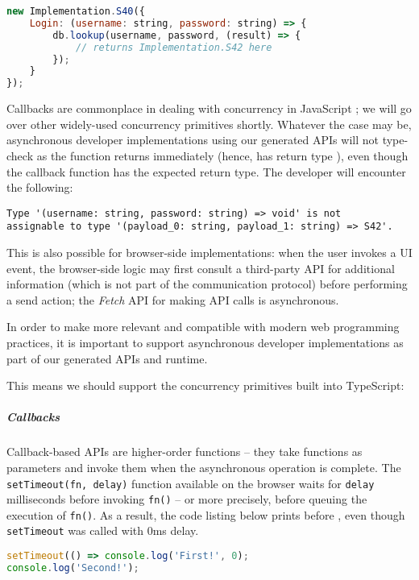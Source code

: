 \begin{lstlisting}[language=javascript]
new Implementation.S40({
	Login: (username: string, password: string) => {
		db.lookup(username, password, (result) => {
			// returns Implementation.S42 here
		});
	}
});
\end{lstlisting}

Callbacks are commonplace in dealing with concurrency in JavaScript
\cite{CallbackHell}; we will go over other widely-used
concurrency primitives shortly.
Whatever the case may be, asynchronous developer implementations
using our generated APIs will not type-check as the function
returns immediately (hence, has return type ),
even though the callback function has the expected return type.
The developer will encounter the following:

\begin{lstlisting}[tabsize=2,numbers=none]
Type '(username: string, password: string) => void' is not 
assignable to type '(payload_0: string, payload_1: string) => S42'.
\end{lstlisting}

This is also possible for browser-side implementations:
when the user invokes a UI event, the browser-side logic
may first consult a third-party API for additional information
(which is not part of the communication protocol)
before performing a send action; the \textit{Fetch} API \cite{Fetch}
for making API calls is asynchronous.

In order to make  more relevant and compatible
with modern web programming practices, it is important to
support asynchronous developer implementations as part of our
generated APIs and runtime. 

This means we should support
the concurrency primitives built into TypeScript:

\subparagraph{Callbacks}
Callback-based APIs are higher-order functions -- they take functions
as parameters and invoke them when the asynchronous operation is complete.
The \texttt{setTimeout(fn, delay)} function available on the browser
waits for \texttt{delay} milliseconds before invoking \texttt{fn()} --
or more precisely, before queuing the execution of \texttt{fn()}.
As a result, the code listing below prints 
before , even though \texttt{setTimeout}
was called with 0ms delay.

\begin{lstlisting}[language=javascript,numbers=none]
setTimeout(() => console.log('First!', 0);
console.log('Second!');
\end{lstlisting}


